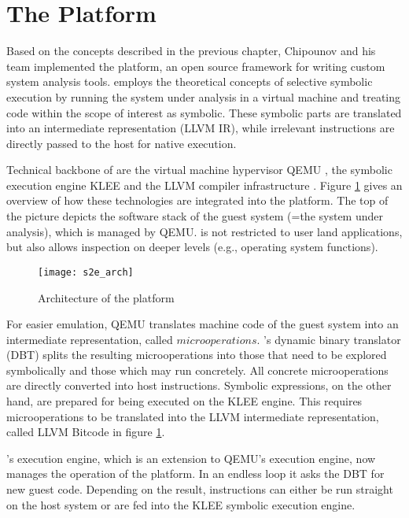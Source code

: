 \section{The \sse Platform}\label{sec:platform}

Based on the concepts described in the previous chapter, Chipounov and his team implemented the \sse platform, an open source framework for writing custom system analysis tools.
\sse employs the theoretical concepts of selective symbolic execution by running the system under analysis in a virtual machine and treating code within the scope of interest as symbolic.
These symbolic parts are translated into an intermediate representation (LLVM IR), while irrelevant instructions are directly passed to the host for native execution.


Technical backbone of \sse are the virtual machine hypervisor QEMU \cite{qemu, qemu05}, the symbolic execution engine KLEE \cite{klee, klee08} and the LLVM compiler infrastructure \cite{llvm, llvm04}.
Figure \ref{fig:arch} gives an overview of how these technologies are integrated into the \sse platform.
The top of the picture depicts the software stack of the guest system (=the system under analysis), which is managed by QEMU.
\sse is not restricted to user land applications, but also allows inspection on deeper levels (e.g., operating system functions).


\begin{figure}
\texttt{[image: s2e\_arch]}
\caption{Architecture of the \sse platform \cite{chip12s2e}}
\label{fig:arch}
\end{figure}


For easier emulation, QEMU translates machine code of the guest system into an intermediate representation, called $microoperations$.
\sse's dynamic binary translator (DBT) splits the resulting microoperations into those that need to be explored symbolically and those which may run concretely.
All concrete microoperations are directly converted into host instructions.
Symbolic expressions, on the other hand, are prepared for being executed on the KLEE engine.
This requires microoperations to be translated into the LLVM intermediate representation, called LLVM Bitcode in figure \ref{fig:arch}.

\sse's execution engine, which is an extension to QEMU's execution engine, now manages the operation of the platform.
In an endless loop it asks the DBT for new guest code.
Depending on the result, instructions can either be run straight on the host system or are fed into the KLEE symbolic execution engine.

